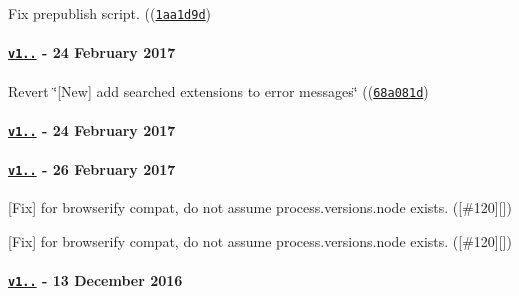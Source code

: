\begin{DoxyItemize}
\item Fix prepublish script. ((\href{https://github.com/browserify/resolve/commit/1aa1d9d9adc60691431efbde8d915c143cd54916}{\tt {\ttfamily 1aa1d9d}})
\end{DoxyItemize}

\paragraph*{\href{https://github.com/browserify/resolve/compare/v1.3.0...v1.3.1}{\tt v1..} -\/ 24 February 2017}


\begin{DoxyItemize}
\item Revert \char`\"{}\mbox{[}\+New\mbox{]} add searched extensions to error messages\char`\"{} ((\href{https://github.com/browserify/resolve/commit/68a081d1c7ff6e0fb58aeff4b6ac06aada7812c4}{\tt {\ttfamily 68a081d}})
\end{DoxyItemize}

\paragraph*{\href{https://github.com/browserify/resolve/compare/v1.2.0...v1.3.0}{\tt v1..} -\/ 24 February 2017}

\paragraph*{\href{https://github.com/browserify/resolve/compare/v1.3.1...v1.2.1}{\tt v1..} -\/ 26 February 2017}


\begin{DoxyItemize}
\item \mbox{[}Fix\mbox{]} for browserify compat, do not assume {\ttfamily process.\+versions.\+node} exists. (\mbox{[}{\ttfamily \#120}\mbox{]}\mbox{[}\mbox{]})
\item \mbox{[}Fix\mbox{]} for browserify compat, do not assume {\ttfamily process.\+versions.\+node} exists. (\mbox{[}{\ttfamily \#120}\mbox{]}\mbox{[}\mbox{]})
\end{DoxyItemize}

\paragraph*{\href{https://github.com/browserify/resolve/compare/v1.1.7...v1.2.0}{\tt v1..} -\/ 13 December 2016}


